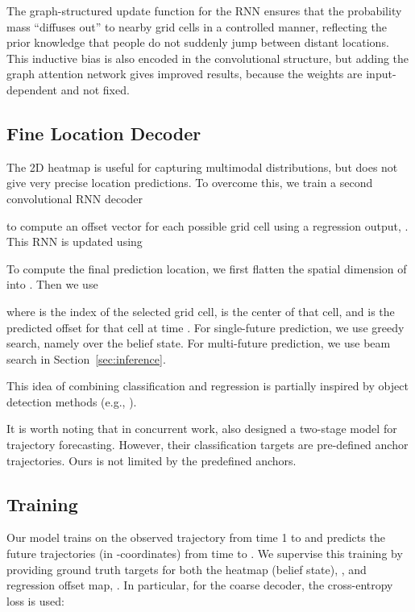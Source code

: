 \documentclass[10pt,twocolumn,letterpaper]{article}
\newcommand{\eat}[1]{}
\begin{document}
The graph-structured
update function for the RNN ensures that the probability
mass  ``diffuses out'' to nearby grid cells
in a controlled manner, reflecting the prior knowledge
that people do not suddenly jump between distant locations.
This inductive bias is also encoded in the convolutional structure,
but adding the graph attention network gives improved results,
because the weights are input-dependent and not fixed.


\vspace{-1mm}
\subsection{Fine Location Decoder}
\label{sec:fineDecoder}
\vspace{-1mm}

The 2D heatmap is useful for capturing multimodal distributions, but does not give very precise location predictions. 
To overcome this, we train a second convolutional RNN decoder

to compute an offset vector for each possible
grid cell
using a regression output, .
This RNN is updated using



\noindent To compute the final prediction location, we first flatten the spatial dimension of  into . Then we use

where  is the index of the
selected grid cell,
 is the center of that cell,
and  is the predicted offset for that cell at time .
For single-future prediction, we use greedy search, namely  over the belief state. For multi-future prediction, we use beam search in Section~\ref{sec:inference}.


This idea of combining classification
and regression is partially inspired by
object detection methods
(e.g., \cite{ren2015faster}).
\eat{
Different from prior works~\cite{bansal2018chauffeurnet,li2019way,manh2018scene,xue2018ss,liang2019peeking}, our model introduces an additional regression network for sequential fine-grained prediction.
}
It is worth noting that in concurrent work,
\cite{chai2019multipath} also designed a two-stage
model for trajectory forecasting.
However, their classification targets are pre-defined anchor trajectories.
Ours is not limited by the predefined anchors.

\vspace{-1mm}
\subsection{Training}
\vspace{-1mm}
Our model trains on the observed trajectory from time 1 to  and predicts the future trajectories (in  -coordinates) from time  to .
We supervise this training by providing ground
truth targets for both the heatmap (belief state), ,
and regression offset map, .
In particular, for the coarse decoder,
 the cross-entropy loss is used:
\end{document}
